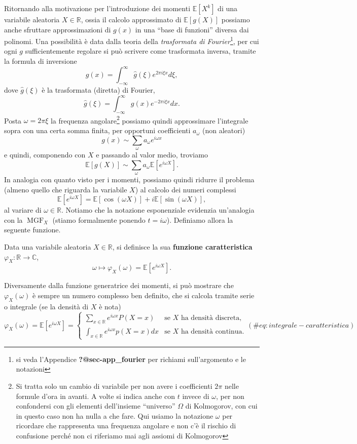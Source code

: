 \documentclass[
  italian,
  letterpaper,
]{book}
\newcommand{\sqa}[1]{\left[ #1 \right]}
\newcommand{\R}{\mathbb{R}}
\newcommand{\E}[1]{\mathbb{E}\sqa{#1}}
\newcommand{\MGF}{\operatorname{MGF}}
\theoremstyle{definition}
\theoremstyle{remark}
\begin{document}
Ritornando alla motivazione per l'introduzione dei momenti \(\E{X^k}\)
di una variabile aleatoria \(X\in \R\), ossia il calcolo approssimato di
\(\E{g(X)}\) possiamo anche sfruttare approssimazioni di \(g(x)\) in una
``base di funzioni'' diversa dai polinomi. Una possibilità è data dalla
teoria della \emph{trasformata di Fourier}\footnote{si veda l'Appendice
  \textbf{?@sec-app\_fourier} per richiami sull'argomento e le notazioni},
per cui ogni \(g\) sufficientemente regolare si può scrivere come
trasformata inversa, tramite la formula di inversione
\[ g(x) =  \int_{-\infty}^\infty \hat{g}(\xi) e^{2 \pi i \xi x} d \xi,\]
dove \(\hat{g}(\xi)\) è la trasformata (diretta) di Fourier,
\[ \hat{g}(\xi)= \int_{-\infty}^\infty g(x) e^{-2 \pi i \xi x} d x.\]
Posta \(\omega = 2 \pi \xi\) la frequenza angolare\footnote{Si tratta
  solo un cambio di variabile per non avere i coefficienti \(2 \pi\)
  nelle formule d'ora in avanti. A volte si indica anche con \(t\)
  invece di \(\omega\), per non confondersi con gli elementi
  dell'insieme ``universo'' \(\Omega\) di Kolmogorov, con cui in questo
  caso non ha nulla a che fare. Qui usiamo la notazione \(\omega\) per
  ricordare che rappresenta una frequenza angolare e non c'è il rischio
  di confusione perché non ci riferiamo mai agli assiomi di Kolmogorov}
possiamo quindi approssimare l'integrale sopra con una certa somma
finita, per opportuni coefficienti \(a_\omega\) (non aleatori)
\[ g(x) \sim \sum_{\omega} a_\omega e^{i \omega x}\] e quindi,
componendo con \(X\) e passando al valor medio, troviamo
\[\E{g(X)} \sim \sum_{\omega} a_\omega \E{e^{i \omega X}}.\] In analogia
con quanto visto per i momenti, possiamo quindi ridurre il problema
(almeno quello che riguarda la variabile \(X\)) al calcolo dei numeri
complessi
\[ \E{e^{i \omega X}} = \E{\cos(\omega X)}+ i \E{\sin(\omega X)},\] al
variare di \(\omega \in \R\). Notiamo che la notazione esponenziale
evidenzia un'analogia con la \(\MGF_X\) (stiamo formalmente ponendo
\(t = i \omega\)). Definiamo allora la seguente funzione.

Data una variabile aleatoria \(X \in \R\), si definisce la sua
\textbf{funzione caratteristica} \(\varphi_X: \R \to \mathbb{C}\),
\[ \omega \mapsto \varphi_X(\omega) = \E{e^{i \omega X}}.\]

Diversamente dalla funzione generatrice dei momenti, si può mostrare che
\(\varphi_X(\omega)\) è sempre un numero complesso ben definito, che si
calcola tramite serie o integrale (se la densità di \(X\) è nota)
\[ \varphi_X(\omega) = \E{e^{i \omega X}} = \begin{cases} \sum_{x \in \R} e^{i\omega x} P(X=x) & \text{se $X$ ha densità discreta,}\\
\int_{x \in \R} e^{i \omega x} p(X=x)dx & \text{se $X$ ha densità continua.}
\end{cases}
(\#eq:integrale-caratteristica)\]
\end{document}
